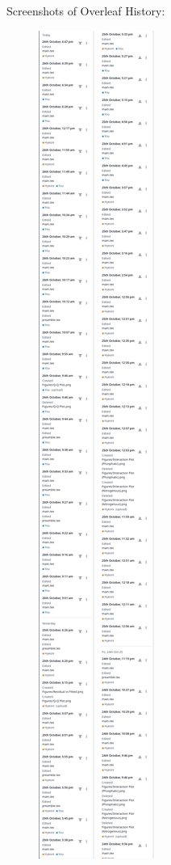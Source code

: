 \documentclass[12pt]{article}
\begin{document}
Screenshots of Overleaf History:
\begin{figure}[ht]
    \includegraphics[width=0.08\linewidth]{History/History 1.png}
    \includegraphics[width=0.08\linewidth]{History/History 2.png}

\end{figure}
\end{document}
